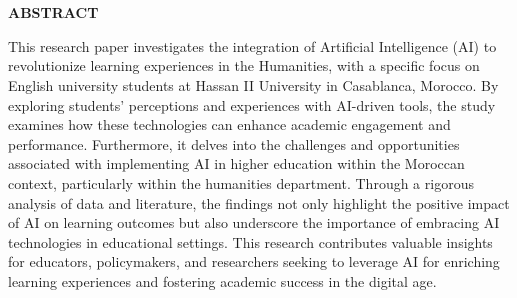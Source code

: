
\newenvironment{myabstract}
{%
    \thispagestyle{empty}%
    \vspace*{\stretch{2}}%
    \justifying      %
}
{\par %
    \vspace{\stretch{3}} %
    \clearpage           %
}

\chapter*{}
\begin{myabstract}
    \begin{center}
        {\textbf{ABSTRACT}}
    \end{center}
    This research paper investigates the integration of Artificial Intelligence (AI) 
    to revolutionize learning experiences in the Humanities, with a specific focus 
    on English university students at Hassan II University in Casablanca, Morocco. 
    By exploring students' perceptions and experiences with AI-driven tools, 
    the study examines how these technologies can enhance academic engagement and performance. 
    Furthermore, it delves into the challenges and opportunities associated with implementing 
    AI in higher education within the Moroccan context, particularly within the humanities department. 
    Through a rigorous analysis of data and literature, the findings not only highlight the positive 
    impact of AI on learning outcomes but also underscore the importance of embracing AI technologies 
    in educational settings. This research contributes valuable insights for educators, policymakers, 
    and researchers seeking to leverage AI for enriching learning experiences and fostering academic success in the digital age.
\end{myabstract}

